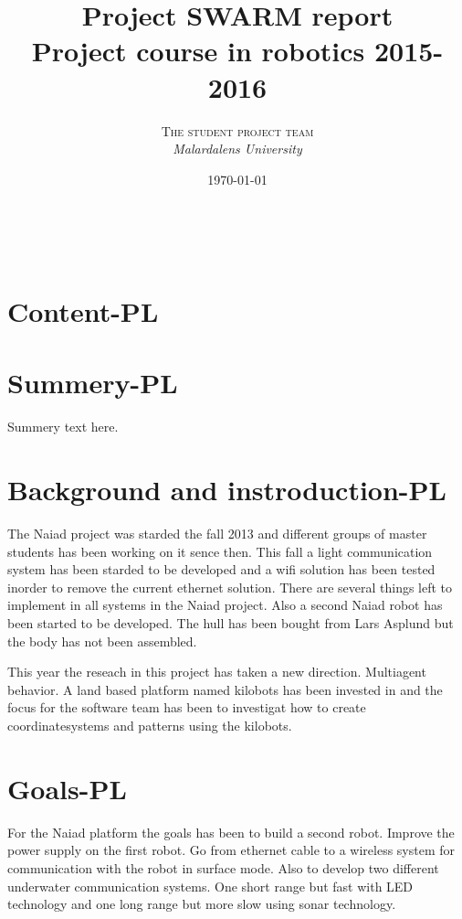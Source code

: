\documentclass[a4paper, 10pt]{article} %
\title{\textbf{Project SWARM report}\\ %
Project course in robotics 2015-2016} %
\author{\textsc{The student project team} %
\\{\textit{Malardalens University}}} %
\date{\today} %
\makeatletter
\renewcommand{\maketitle}{ %
\begin{flushright} %
{\LARGE\@title} %

\vspace{50pt} %

{\large\@author} %
\\\@date %

\vspace{40pt} %
\end{flushright}
}
\makeatother
\begin{document}
\maketitle %


\section{Content-PL}



\section{Summery-PL}
Summery text here.

\section{Background and instroduction-PL}
The Naiad project was starded the fall 2013 and different groups of master students has been working on it sence then. This fall a light communication system has been starded to be developed and a wifi solution has been tested inorder to remove the current ethernet solution. There are several things left to implement in all systems in the Naiad project. Also a second Naiad robot has been started to be developed. The hull has been bought from Lars Asplund but the body has not been assembled.

This year the reseach in this project has taken a new direction. Multiagent behavior. A land based platform named kilobots has been invested in and the focus for the software team has been to investigat how to create coordinatesystems and patterns using the kilobots.

\section{Goals-PL}
For the Naiad platform the goals has been to build a second robot. Improve the power supply on the first robot. Go from ethernet cable to a wireless system for communication with the robot in surface mode. Also to develop two different underwater communication systems. One short range but fast with LED technology and one long range but more slow using sonar technology.
\end{document}
